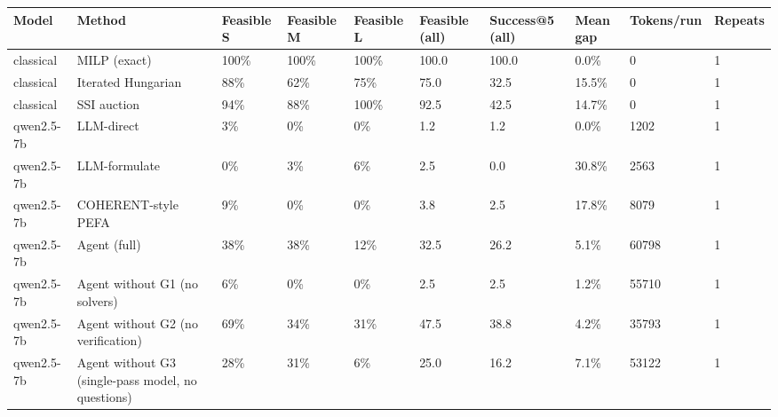 \begin{tabular}{llllllllll}
\toprule
Model & Method & Feasible S & Feasible M & Feasible L & Feasible (all) & Success@5 (all) & Mean gap & Tokens/run & Repeats \\
\midrule
classical & MILP (exact) & 100\% & 100\% & 100\% & 100.0 & 100.0 & 0.0\% & 0 & 1 \\
classical & Iterated Hungarian & 88\% & 62\% & 75\% & 75.0 & 32.5 & 15.5\% & 0 & 1 \\
classical & SSI auction & 94\% & 88\% & 100\% & 92.5 & 42.5 & 14.7\% & 0 & 1 \\
qwen2.5-7b & LLM-direct & 3\% & 0\% & 0\% & 1.2 & 1.2 & 0.0\% & 1202 & 1 \\
qwen2.5-7b & LLM-formulate & 0\% & 3\% & 6\% & 2.5 & 0.0 & 30.8\% & 2563 & 1 \\
qwen2.5-7b & COHERENT-style PEFA & 9\% & 0\% & 0\% & 3.8 & 2.5 & 17.8\% & 8079 & 1 \\
qwen2.5-7b & Agent (full) & 38\% & 38\% & 12\% & 32.5 & 26.2 & 5.1\% & 60798 & 1 \\
qwen2.5-7b & Agent without G1 (no solvers) & 6\% & 0\% & 0\% & 2.5 & 2.5 & 1.2\% & 55710 & 1 \\
qwen2.5-7b & Agent without G2 (no verification) & 69\% & 34\% & 31\% & 47.5 & 38.8 & 4.2\% & 35793 & 1 \\
qwen2.5-7b & Agent without G3 (single-pass model, no questions) & 28\% & 31\% & 6\% & 25.0 & 16.2 & 7.1\% & 53122 & 1 \\
\bottomrule
\end{tabular}
